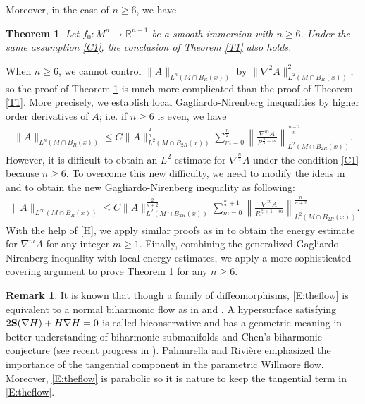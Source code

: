 \documentclass{amsart}
\newtheorem{theorem}{Theorem}[section]
\theoremstyle{definition}
\newtheorem{remark}{Remark}
\numberwithin{equation}{section}
\begin{document}
Moreover, in the case of $n\geq 6$, we  have
\begin{theorem} \label{T2} Let $f_0: M^n \rightarrow \mathbb{R}^{n+1}$ be a smooth  immersion with  $n\geq 6$.  Under the same assumption
\eqref{C1},
the conclusion of  Theorem  \ref{T1}  also holds.
\end{theorem}
When $n\geq 6$, we cannot control $\|A\|_{L^n\left ( M\cap B_{R} (x)  \right)}$  by
$\|\nabla^2A\|_{L^2\left ( M\cap B_{R} (x) \right)}^2$, so  the proof of Theorem    \ref{T2} is much more complicated than  the proof of Theorem
\ref{T1}. More precisely,
we  establish  local Gagliardo-Nirenberg inequalities by higher order derivatives  of $A$; i.e.
 if   $n\geq 6$ is even, we have
\begin{align*}
\|A\|_{L^{n}( M\cap B_{R}(x)) }\leq C\| A\|^{\frac 2 {n} }_{L^2( M\cap B_{2R}(x)) }\sum_{m=0}^{\frac n2}\left \|\frac {\nabla^{m}
A}{R^{\frac
n2 -m}}\right \|^{\frac {n-2} {n}}_{L^2( M\cap B_{2R}(x)) }.
\end{align*}
However,   it is  difficult to obtain an $L^2$-estimate for $\nabla^{\frac n 2} A$ under the condition \eqref{C1} because $n\geq 6$.
To overcome this new difficulty, we need to modify the ideas in \cite{LSU} and \cite{KS1} to obtain the new Gagliardo-Nirenberg inequality as
following:
\begin{align}\label{H}
\|A\|_{L^{\infty}(  M\cap B_{R}(x))}\leq C\| A\|^{\frac 2 {n+2} }_{L^2(  M\cap B_{2R}(x))}\sum_{m=0}^{ \frac n 2 +1}
\left \|\frac {\nabla^m A}{R^{\frac
n2+1 -m}}\right \|^{\frac n
{n+2}}_{L^2(  M\cap B_{2R}(x)) }.
\end{align}
With the help of \eqref{H}, we apply  similar proofs as in \cite{KS1} to  obtain the energy estimate  for  $\nabla^{m} A$ for any integer $m\geq 1$.
Finally,  combining the generalized
Gagliardo-Nirenberg inequality  with local energy estimates, we apply  a more sophisticated covering argument  to prove Theorem  \ref{T2} for
any $n\geq 6$.



\begin{remark}  It is  known  that though a family  of diffeomorphisms,  \eqref{E:theflow} is equivalent to  a normal    biharmonic flow as in \cite{BWW} and \cite{PR}. A hypersurface satisfying  $2{\bf S}(\nabla H)+  H\nabla H=0$ is called biconservative and has a geometric meaning in better understanding  of  biharmonic submanifolds and Chen's biharmonic conjecture (see recent progress in \cite{Fetcu,OC20}). Palmurella and Rivi\`{e}re  \cite{PR}   emphasized the importance of the tangential component in the parametric Willmore flow. Moreover,  \eqref{E:theflow} is parabolic so it is nature to keep the tangential term in \eqref{E:theflow}.
\end{remark}
\end{document}
